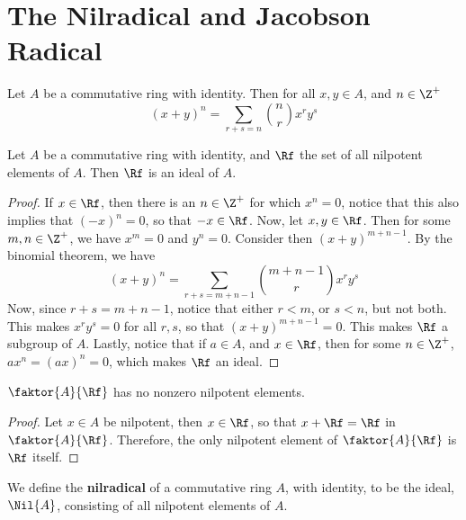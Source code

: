 \section{The Nilradical and Jacobson Radical}

\begin{theorem}\label{1.8.1}
    Let $A$ be a commutative ring with identity. Then for all  $x,y \in A$, and
     $n \in \Z^+$
     \begin{equation*}
         (x+y)^n=\sum_{r+s=n}{{n \choose r}x^ry^s}
     \end{equation*}
\end{theorem}

\begin{lemma}\label{1.8.2}
    Let $A$ be a commutative ring with identity, and $\Rf$ the set of all
    nilpotent elements of $A$. Then $\Rf$ is an ideal of $A$.
\end{lemma}
\begin{proof}
    If $x \in \Rf$, then there is an  $n \in \Z^+$ for which  $x^n=0$, notice
    that this also implies that  $(-x)^n=0$, so that $-x \in \Rf$. Now, let $x,y
    \in \Rf$. Then for some $m,n \in \Z^+$, we have $x^m=0$ and $y^n=0$.
    Consider then $(x+y)^{m+n-1}$. By the binomial theorem, we have
     \begin{equation*}
         (x+y)^n=\sum_{r+s=m+n-1}{{m+n-1 \choose r}x^ry^s}
     \end{equation*}
     Now, since $r+s=m+n-1$, notice that either  $r<m$, or  $s<n$, but not both.
     This makes  $x^ry^s=0$ for all  $r,s$, so that  $(x+y)^{m+n-1}=0$. This
     makes $\Rf$ a subgroup of  $A$. Lastly, notice that if  $a \in A$, and  $x
     \in \Rf$, then for some  $n \in \Z^+$,  $ax^n=(ax)^n=0$, which makes $\Rf$
     an ideal.
\end{proof}
\begin{corollary}
    $\faktor{A}{\Rf}$ has no nonzero nilpotent elements.
\end{corollary}
\begin{proof}
    Let $x \in A$ be nilpotent, then $x \in \Rf$, so that $x+\Rf=\Rf$ in
    $\faktor{A}{\Rf}$. Therefore, the only nilpotent element of
    $\faktor{A}{\Rf}$ is $\Rf$ itself.
\end{proof}

\begin{definition}
    We define the \textbf{nilradical} of a commutative ring $A$, with identity,
    to be the ideal, $\Nil{A}$, consisting of all nilpotent elements of $A$.
\end{definition}

